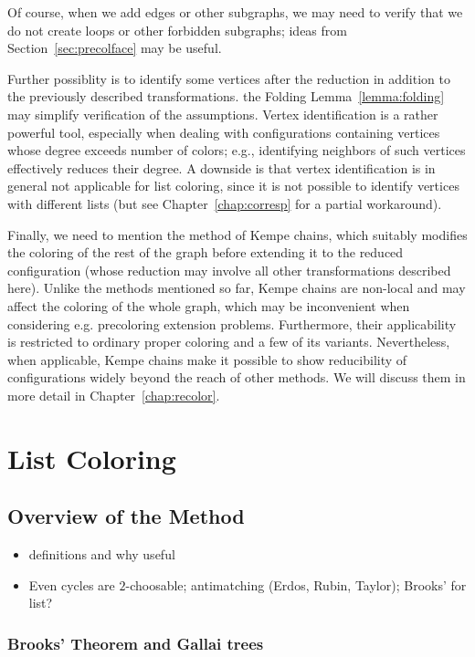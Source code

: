 \documentclass[12pt,twoside,openright,a4paper]{book}
\begin{document}
Of course, when we add edges or other subgraphs, we may need to verify that we do not create loops or other forbidden subgraphs;
ideas from Section~\ref{sec:precolface} may be useful.

Further possiblity is to identify some vertices after the reduction in addition to the previously described transformations.
the Folding Lemma~\ref{lemma:folding} may simplify verification of the assumptions.  Vertex identification is a rather powerful
tool, especially when dealing with configurations containing vertices whose degree exceeds number of colors; e.g., identifying
neighbors of such vertices effectively reduces their degree.  A downside is that vertex identification is in general not
applicable for list coloring, since it is not possible to identify vertices with different lists (but see Chapter~\ref{chap:corresp}
for a partial workaround).

Finally, we need to mention the method of Kempe chains, which suitably modifies the coloring of the rest of the graph
before extending it to the reduced configuration (whose reduction may involve all other transformations described here).
Unlike the methods mentioned so far, Kempe chains are non-local and may affect the coloring of the whole graph, which may be
inconvenient when considering e.g. precoloring extension problems.  Furthermore, their applicability is restricted to ordinary
proper coloring and a few of its variants.  Nevertheless, when applicable, Kempe chains make it possible to show reducibility
of configurations widely beyond the reach of other methods.  We will discuss them in more detail in Chapter~\ref{chap:recolor}.

\chapter{List Coloring}


\section{Overview of the Method}
\begin{itemize}
\item definitions and why useful
\item Even cycles are $2$-choosable; antimatching (Erdos, Rubin, Taylor); Brooks' for list?
\end{itemize}

\subsection{Brooks' Theorem and Gallai trees}\label{ssec-gallai}
\end{document}
